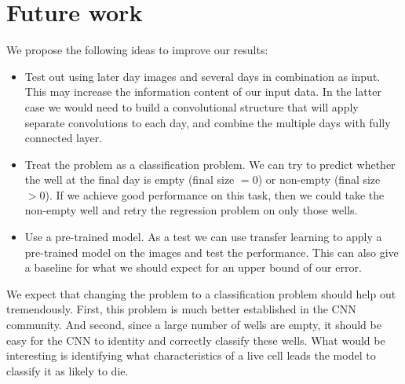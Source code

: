 \documentclass[10pt,twocolumn,letterpaper]{article}
\begin{document}
\section{Future work}

We propose the following ideas to improve our results:
\begin{itemize}
\item Test out using later day images and several days in combination as input.  This may increase the information content of our input data.  In the latter case we would need to build a convolutional structure that will apply separate convolutions to each day, and combine the multiple days with fully connected layer.
\item Treat the problem as a classification problem.  We can try to predict whether the well at the final day is empty (final size $= 0$) or non-empty (final size $> 0$).  If we achieve good performance on this task, then we could take the non-empty well and retry the regression problem on only those wells.
\item Use a pre-trained model.  As a test we can use transfer learning to apply a pre-trained model on the images and test the performance.  This can also give a baseline for what we should expect for an upper bound of our error.
\end{itemize}

We expect that changing the problem to a classification problem should help out tremendously.  First, this problem is much better established in the CNN community.  And second, since a large number of wells are empty, it should be easy for the CNN to identity and correctly classify these wells.    What would be interesting is identifying what characteristics of a live cell leads the model to classify it as likely to die.  

{\small


}
\end{document}
